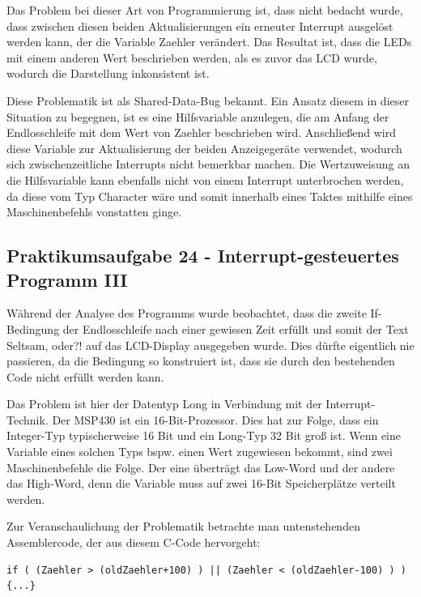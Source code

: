 \documentclass[12pt,a4paper,bibliography=totocnumbered,listof=totocnumbered]{scrartcl}
\begin{document}
Das Problem bei dieser Art von Programmierung ist, dass nicht bedacht wurde, dass zwischen diesen beiden Aktualisierungen ein erneuter Interrupt ausgelöst werden kann, der die Variable \glqq Zaehler\grqq{} verändert. 
Das Resultat ist, dass die LEDs mit einem anderen Wert beschrieben werden, als es zuvor das LCD wurde, wodurch die Darstellung inkonsistent ist. 

Diese Problematik ist als Shared-Data-Bug bekannt. Ein Ansatz diesem in dieser Situation zu begegnen, ist es eine Hilfsvariable anzulegen, die am Anfang der Endlosschleife mit dem Wert von \glqq Zaehler\grqq{} beschrieben wird. Anschließend wird diese Variable zur Aktualisierung der beiden Anzeigegeräte verwendet, wodurch sich zwischenzeitliche Interrupts nicht bemerkbar machen. Die Wertzuweisung an die Hilfsvariable kann ebenfalls nicht von einem Interrupt unterbrochen werden, da diese vom Typ Character wäre und somit innerhalb eines Taktes mithilfe eines Maschinenbefehls vonstatten ginge.


\subsection{Praktikumsaufgabe 24 - Interrupt-gesteuertes Programm III}
Während der Analyse des Programms wurde beobachtet, dass die zweite If-Bedingung der Endlosschleife nach einer gewissen Zeit erfüllt und somit der Text \glqq Seltsam, oder?!\grqq{} auf das LCD-Display ausgegeben wurde. Dies dürfte eigentlich nie passieren, da die Bedingung so konstruiert ist, dass sie durch den bestehenden Code nicht erfüllt werden kann.

Das Problem ist hier der Datentyp Long in Verbindung mit der Interrupt-Technik.
Der MSP430 ist ein 16-Bit-Prozessor. Dies hat zur Folge, dass ein Integer-Typ typischerweise 16 Bit und ein Long-Typ 32 Bit groß ist. Wenn eine Variable eines solchen Typs bspw. einen Wert zugewiesen bekommt, sind zwei Maschinenbefehle die Folge. Der eine überträgt das Low-Word und der andere das High-Word, denn die Variable muss auf zwei 16-Bit Speicherplätze verteilt werden.

Zur Veranschaulichung der Problematik betrachte man untenstehenden Assemblercode, der aus diesem C-Code hervorgeht:

\begin{lstlisting}[caption=C-Code MSP430, label=lst:LongInterruptC]
if ( (Zaehler > (oldZaehler+100) ) || (Zaehler < (oldZaehler-100) ) ) {...}
\end{lstlisting}
\end{document}
